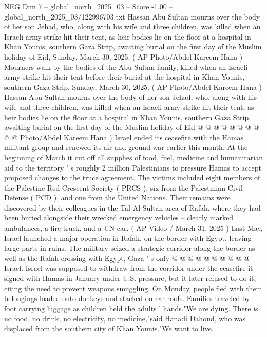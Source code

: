 \begin{textsample}{NEG Dim 7 – global\_north\_2025\_03 – Score -1.00 – global\_north\_2025\_03/122996703.txt}  \label{ex:f7_neg_133}
Hassan Abu Sultan mourns over the body of her son Jehad, who, along with his wife and three children, was killed when an Israeli army strike hit their tent, as heir bodies lie on the floor at a hospital in Khan Younis, southern Gaza Strip, awaiting burial on the first day of the Muslim holiday of Eid, Sunday, March 30, 2025. ( AP Photo/Abdel Kareem Hana ) Mourners walk by the bodies of the Abu Sultan family, killed when an Israeli army strike hit their tent before their burial at the hospital in Khan Younis, southern Gaza Strip, Sunday, March 30, 2025. ( AP Photo/Abdel Kareem Hana ) Hassan Abu Sultan mourns over the body of her son Jehad, who, along with his wife and three children, was killed when an Israeli army strike hit their tent, as heir bodies lie on the floor at a hospital in Khan Younis, southern Gaza Strip, awaiting burial on the first day of the Muslim holiday of Eid @ @ @ @ @ @ @ @ @ @ Photo/Abdel Kareem Hana ) Israel ended its ceasefire with the Hamas militant group and renewed its air and ground war earlier this month.
At the beginning of March it cut off all supplies of food, fuel, medicine and humanitarian aid to the territory ' s roughly 2 million Palestinians to pressure Hamas to accept proposed changes to the truce agreement.
The victims included eight members of the Palestine Red Crescent Society ( PRCS ), six from the Palestinian Civil Defense ( PCD ), and one from the United Nations.
Their remains were discovered by their colleagues in the Tal Al-Sultan area of Rafah, where they had been buried alongside their wrecked emergency vehicles -- clearly marked ambulances, a fire truck, and a UN car. ( AP Video / March 31, 2025 ) Last May, Israel launched a major operation in Rafah, on the border with Egypt, leaving large parts in ruins.
The military seized a strategic corridor along the border as well as the Rafah crossing with Egypt, Gaza ' s only @ @ @ @ @ @ @ @ @ @ Israel.
Israel was supposed to withdraw from the corridor under the ceasefire it signed with Hamas in January under U.S. pressure, but it later refused to do it, citing the need to prevent weapons smuggling.
On Monday, people fled with their belongings loaded onto donkeys and stacked on car roofs.
Families traveled by foot carrying luggage as children held the adults ' hands."We are dying.
There is no food, no drink, no electricity, no medicine,"said Hanadi Dahoud, who was displaced from the southern city of Khan Younis."We want to live.

\end{textsample}
